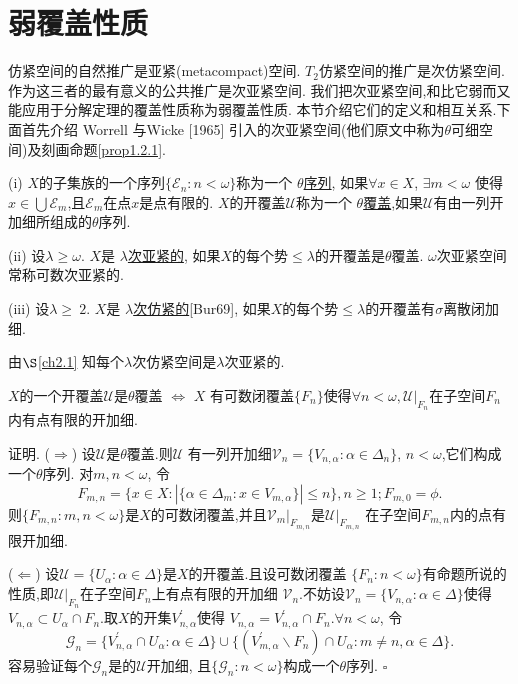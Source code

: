 \documentclass[main.tex]{subfiles}
\begin{document}
\section{弱覆盖性质}\label{ch1.2}
仿紧空间的自然推广是亚紧(metacompact)空间.
$T_2$仿紧空间的推广是次仿紧空间.
作为这三者的最有意义的公共推广是次亚紧空间.
我们把次亚紧空间,和比它弱而又能应用于分解定理的覆盖性质称为弱覆盖性质.
本节介绍它们的定义和相互关系.下面首先介绍 Worrell 与Wicke [1965] 引入的次亚紧空间(他们原文中称为$\theta$可细空间)及刻画命题\ref{prop1.2.1}.

\begin{definition}
\textnormal{(i)} $X$的子集族的一个序列$\{\mathscr{E}_n:n<\omega\}$称为一个
\underline{$\theta$序列},
如果$\forall x\in X$, $ \exists m < \omega$ 使得$x\in\bigcup \mathscr{E}_m$,且$\mathscr{E}_m$在点$x$是点有限的.
$X$的开覆盖$\mathscr{U}$称为一个 \underline{$\theta$覆盖},如果$\mathscr{U}$有由一列开加细所组成的$\theta$序列.

\textnormal{(ii)} 设$\lambda\ge\omega$. $X$是 \underline{$\lambda$次亚紧的},
如果$X$的每个势$\le\lambda$的开覆盖是$\theta$覆盖.
$\omega$次亚紧空间常称可数次亚紧的.


\textnormal{(iii)} 设$\lambda\ge\ 2$. $X$是 \underline{$\lambda$次仿紧的}\textnormal{[Bur69]},
如果$X$的每个势$\le\lambda$的开覆盖有$\sigma$离散闭加细.
\end{definition}

由$\S$\ref{ch2.1} 知每个$\lambda$次仿紧空间是$\lambda$次亚紧的.

\begin{proposition}\label{prop1.2.1}
$X$的一个开覆盖$\mathscr{U}$是$\theta$覆盖 $\Leftrightarrow$
$X$ 有可数闭覆盖$\{F_n\}$使得$\forall n < \omega, \mathscr{U}|_{F_n}$在子空间${F_n}$内有点有限的开加细.
\end{proposition}

证明. ($\Rightarrow$) 设$\mathscr{U}$是$\theta$覆盖.则$\mathscr{U}$
有一列开加细$\mathscr{V}_n = \{V_{n, \alpha}: \alpha\in \Delta_n\}$,
$n<\omega$,它们构成一个$\theta$序列.
对$m,n<\omega$, 令
$$F_{m,n}=\{x\in X: |\{\alpha\in\Delta_m: x\in V_{m,\alpha}\}|\le n\}, n\ge 1; F_{m,0} = \phi.$$
则$\{F_{m,n}:m,n<\omega\}$是$X$的可数闭覆盖,并且$\mathscr{V}_m|_{F_{m,n}}$是$\mathscr{U}|_{F_{m,n}}$
在子空间$F_{m,n}$内的点有限开加细.

($\Leftarrow$) 设$\mathscr{U} = \{ U_\alpha: \alpha\in\Delta\}$是$X$的开覆盖.且设可数闭覆盖
$\{F_n:n<\omega\}$有命题所说的性质,即$\mathscr{U}|_{F_n}$在子空间$F_n$上有点有限的开加细
$\mathscr{V}_n$.不妨设$\mathscr{V}_n=\{V_{n,\alpha}:\alpha\in\Delta\}$使得
$V_{n,\alpha}\subset U_\alpha\cap F_n$.取$X$的开集$V_{n,\alpha}^\prime$使得
$V_{n,\alpha}=V_{n,\alpha}^\prime\cap F_n$.$\forall n<\omega$, 令
$$\mathscr{G}_n=\{V_{n,\alpha}^\prime\cap U_\alpha:\alpha\in\Delta\}
\cup\{(V_{m,\alpha}^\prime\backslash F_n)\cap U_\alpha: m\ne n, \alpha\in\Delta\}.$$
容易验证每个$\mathscr{G}_n$是的$\mathscr{U}$开加细,
且$\{\mathscr{G}_n:n<\omega\}$构成一个$\theta$序列.  $\square$
\end{document}
